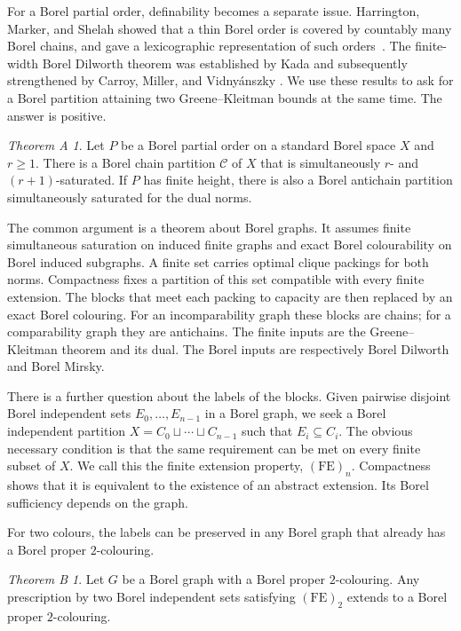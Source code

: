 \documentclass[11pt,reqno]{amsart}
\theoremstyle{plain}
\theoremstyle{definition}
\theoremstyle{remark}
\newtheorem{theoremA}{Theorem A}
\newtheorem{theoremB}{Theorem B}
\begin{document}
For a Borel partial order, definability becomes a separate issue.
Harrington, Marker, and Shelah showed that a thin Borel order is covered
by countably many Borel chains, and gave a lexicographic representation
of such orders~\cite{HarringtonMarkerShelah1988}. The finite-width Borel
Dilworth theorem was established by Kada and subsequently strengthened
by Carroy, Miller, and Vidny\'anszky
\cite{Kada1989,CarroyMillerVidnyanszky2021}. We use these results to
ask for a Borel partition attaining two Greene--Kleitman bounds at the
same time. The answer is positive.

\begin{theoremA}
Let $P$ be a Borel partial order on a standard Borel space $X$ and
$r\ge1$. There is a Borel chain partition $\mathcal C$ of $X$ that is
simultaneously $r$- and $(r+1)$-saturated. If $P$ has finite height,
there is also a Borel antichain partition simultaneously saturated for
the dual norms.
\end{theoremA}

The common argument is a theorem about Borel graphs. It assumes finite
simultaneous saturation on induced finite graphs and exact Borel
colourability on Borel induced subgraphs. A finite set carries optimal
clique packings for both norms. Compactness fixes a partition of this
set compatible with every finite extension. The blocks that meet each
packing to capacity are then replaced by an exact Borel colouring.
For an incomparability graph these blocks are chains; for a
comparability graph they are antichains. The finite inputs are the
Greene--Kleitman theorem and its dual. The Borel inputs are respectively
Borel Dilworth and Borel Mirsky.

There is a further question about the labels of the blocks. Given
pairwise disjoint Borel independent sets $E_0,\ldots,E_{n-1}$ in a
Borel graph, we seek a Borel independent partition
$X=C_0\sqcup\cdots\sqcup C_{n-1}$ such that $E_i\subseteq C_i$.
The obvious necessary condition is that the same requirement can be
met on every finite subset of $X$. We call this the finite extension
property, $\mathrm{(FE)}_n$. Compactness shows that it is equivalent to
the existence of an abstract extension. Its Borel sufficiency depends
on the graph.

For two colours, the labels can be preserved in any Borel graph that
already has a Borel proper $2$-colouring.

\begin{theoremB}
Let $G$ be a Borel graph with a Borel proper $2$-colouring. Any
prescription by two Borel independent sets satisfying
$\mathrm{(FE)}_2$ extends to a Borel proper $2$-colouring.
\end{theoremB}
\end{document}
